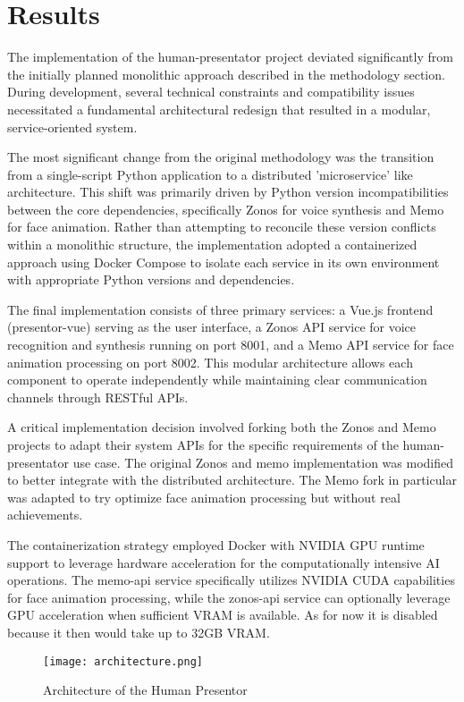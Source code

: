 \section{Results}

The implementation of the human-presentator project deviated significantly from the initially
planned monolithic approach described in the methodology section. During development, several
technical constraints and compatibility issues necessitated a fundamental architectural redesign
that resulted in a modular, service-oriented system.

The most significant change from the original methodology was the transition from a single-script
Python application to a distributed 'microservice' like architecture. This shift was primarily driven by
Python version incompatibilities between the core dependencies, specifically Zonos for voice
synthesis and Memo for face animation. Rather than attempting to reconcile these version conflicts
within a monolithic structure, the implementation adopted a containerized approach using Docker
Compose to isolate each service in its own environment with appropriate Python versions and
dependencies.

The final implementation consists of three primary services: a Vue.js frontend (presentor-vue)
serving as the user interface, a Zonos API service for voice recognition and synthesis running on
port 8001, and a Memo API service for face animation processing on port 8002. This modular
architecture allows each component to operate independently while maintaining clear communication
channels through RESTful APIs.

A critical implementation decision involved forking both the Zonos and Memo projects to adapt their
system APIs for the specific requirements of the human-presentator use case. The original Zonos and
memo implementation was modified to better integrate with the distributed architecture. The Memo
fork in particular was adapted to try optimize face animation processing but without real
achievements.

The containerization strategy employed Docker with NVIDIA GPU runtime support to leverage hardware
acceleration for the computationally intensive AI operations. The memo-api service specifically
utilizes NVIDIA CUDA capabilities for face animation processing, while the zonos-api service can
optionally leverage GPU acceleration when sufficient VRAM is available. As for now it is disabled
because it then would take up to 32GB VRAM.

\begin{figure}[H]
  \centering
  \texttt{[image: architecture.png]}
  \caption{Architecture of the Human Presentor}
  \label{fig:architecture}
\end{figure}

